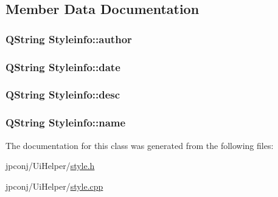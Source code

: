 \subsection{Member Data Documentation}
\subsubsection[{\texorpdfstring{author}{author}}]{\setlength{\rightskip}{0pt plus 5cm}Q\+String Styleinfo\+::author}\hypertarget{class_styleinfo_aecc1699be81d540afaeb2885364418d4}{}\label{class_styleinfo_aecc1699be81d540afaeb2885364418d4}
\subsubsection[{\texorpdfstring{date}{date}}]{\setlength{\rightskip}{0pt plus 5cm}Q\+String Styleinfo\+::date}\hypertarget{class_styleinfo_a6b42ab079973bbbb98daf43d458f55cb}{}\label{class_styleinfo_a6b42ab079973bbbb98daf43d458f55cb}
\subsubsection[{\texorpdfstring{desc}{desc}}]{\setlength{\rightskip}{0pt plus 5cm}Q\+String Styleinfo\+::desc}\hypertarget{class_styleinfo_a20d335e74f4b6eb61ff68ea6fd5d5097}{}\label{class_styleinfo_a20d335e74f4b6eb61ff68ea6fd5d5097}
\subsubsection[{\texorpdfstring{name}{name}}]{\setlength{\rightskip}{0pt plus 5cm}Q\+String Styleinfo\+::name}\hypertarget{class_styleinfo_ae3a7adfee45d7417a5d4b402078be819}{}\label{class_styleinfo_ae3a7adfee45d7417a5d4b402078be819}


The documentation for this class was generated from the following files\+:\begin{DoxyCompactItemize}
\item 
jpconj/\+Ui\+Helper/\hyperlink{style_8h}{style.\+h}\item 
jpconj/\+Ui\+Helper/\hyperlink{style_8cpp}{style.\+cpp}\end{DoxyCompactItemize}
